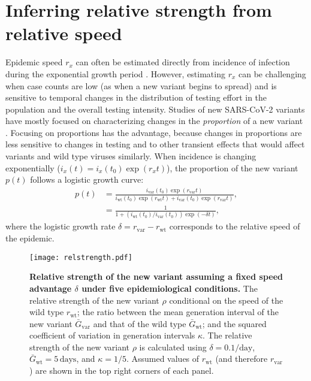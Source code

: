 \documentclass[12pt]{article}
\newcommand{\vvvar}{\mathrm{var}}
\newcommand{\wwwt}{\mathrm{wt}}
\newcommand{\rx}[1]{\ensuremath{{r}_{#1}}\xspace}
\newcommand{\rw}{\rx{\wwwt}}
\newcommand{\rv}{\rx{\vvvar}}
\newcommand{\days}{\ensuremath{\, \textrm{days}}}
\newcommand{\pday}{\ensuremath{/\textrm{day}}}
\newcommand{\ix}[1]{\ensuremath{{i}_{#1}}\xspace}
\newcommand{\iw}{\ix{\wwwt}}
\newcommand{\iv}{\ix{\vvvar}}
\newcommand{\Gx}[1]{\ensuremath{{\bar G}_{#1}}\xspace}
\newcommand{\Gw}{\Gx{\wwwt}}
\newcommand{\Gv}{\Gx{\vvvar}}
\begin{document}
\section{Inferring relative strength from relative speed}

Epidemic speed $r_x$ can often be estimated directly from incidence of infection during the exponential growth period \citep{mills2004transmissibility,nishiura2009transmission,ma2014estimating}.
However, estimating $r_x$ can be challenging when case counts are low (as when a new variant begins to spread) and is sensitive to temporal changes in the distribution of testing effort in the population and the overall testing intensity.
Studies of new SARS-CoV-2 variants have mostly focused on characterizing changes in the \emph{proportion} of a new variant \citep{switzerland2021variant, davies2021estimated, di2021impact, leung2021early, volz2021transmission,zhao2021}.
Focusing on proportions has the advantage, because changes in proportions are less sensitive to changes in testing and to other transient effects that would affect variants and wild type viruses similarly.
When incidence is changing exponentially ($i_x(t) = i_x(t_0) \exp(r_x t)$), the proportion of the new variant $p(t)$ follows a logistic growth curve:
\begin{align}
p(t) &= \frac{\iv(t_0) \exp(\rv t)}{\iw(t_0) \exp(\rw t) + \iv(t_0) \exp(\rv t)},
\\ &= \frac{1}{1 + \left(\iw(t_0)/\iv(t_0)\right) \exp(-\delta t)},
\end{align}
where the logistic growth rate $\delta = \rv - \rw$ corresponds to the relative speed of the epidemic.

\begin{figure}[!t]
\texttt{[image: relstrength.pdf]}
\caption{
\textbf{Relative strength of the new variant assuming a fixed speed advantage $\delta$ under five epidemiological conditions.}
The relative strength of the new variant $\rho$ conditional on the speed of the wild type $\rw$; the ratio between the mean generation interval of the new variant $\Gv$ and that of the wild type $\Gw$; and the squared coefficient of variation in generation intervals $\kappa$.
The relative strength of the new variant $\rho$ is calculated using $\delta=0.1\pday$, $\Gw = 5\days$, and $\kappa = 1/5$.
Assumed values of $\rw$ (and therefore $\rv$) are shown in the top right corners of each panel.
}
\label{fig:relstrength}
\end{figure}
\end{document}
